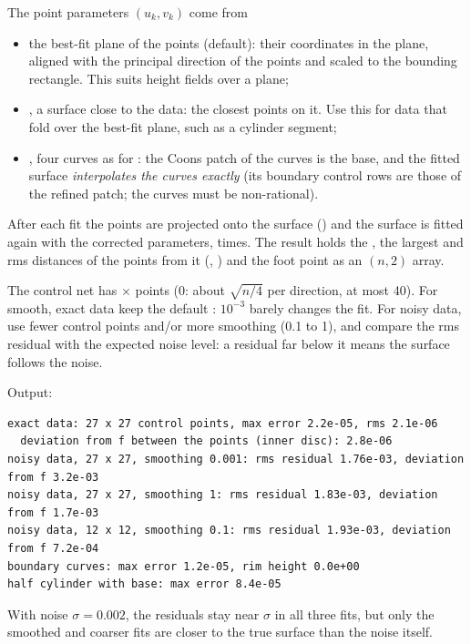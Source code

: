 The point parameters $(u_k, v_k)$ come from
\begin{itemize}
  \item the best-fit plane of the points (default): their coordinates in the plane, aligned with
    the principal direction of the points and scaled to the bounding rectangle. This suits
    height fields over a plane;
  \item {}, a surface close to the data: the closest points on it. Use this for data
    that fold over the best-fit plane, such as a cylinder segment;
  \item {}, four curves \code{[c0, c1, d0, d1]} as for : the Coons
    patch of the curves is the base, and the fitted surface \emph{interpolates the curves
    exactly} (its boundary control rows are those of the refined patch; the curves must be
    non-rational).
\end{itemize}
After each fit the points are projected onto the surface () and the
surface is fitted again with the corrected parameters,  times. The result
 holds the , the largest and rms distances of the points from
it (, ) and the foot point  as an $(n, 2)$
array.

The control net has  $\times$  points (0: about $\sqrt{n/4}$ per
direction, at most 40). For smooth, exact data keep the default : $10^{-3}$ barely
changes the fit. For noisy data, use fewer control points and/or more smoothing (0.1 to 1),
and compare the rms residual with the expected noise level: a residual far below it means the
surface follows the noise.


Output:

\begin{lstlisting}[style=text]
exact data: 27 x 27 control points, max error 2.2e-05, rms 2.1e-06
  deviation from f between the points (inner disc): 2.8e-06
noisy data, 27 x 27, smoothing 0.001: rms residual 1.76e-03, deviation from f 3.2e-03
noisy data, 27 x 27, smoothing 1: rms residual 1.83e-03, deviation from f 1.7e-03
noisy data, 12 x 12, smoothing 0.1: rms residual 1.93e-03, deviation from f 7.2e-04
boundary curves: max error 1.2e-05, rim height 0.0e+00
half cylinder with base: max error 8.4e-05
\end{lstlisting}

With noise $\sigma = 0.002$, the residuals stay near $\sigma$ in all three fits, but only the
smoothed and coarser fits are closer to the true surface than the noise itself.

